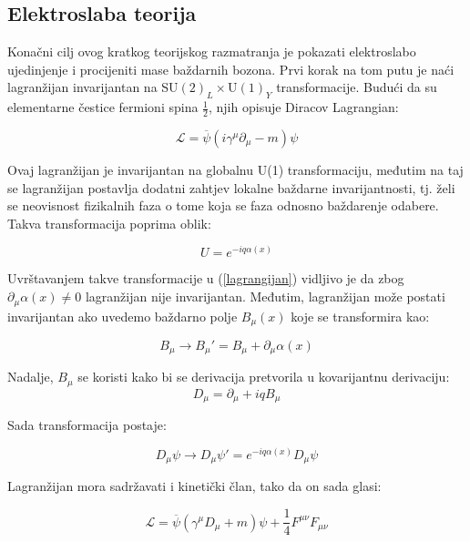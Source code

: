 \documentclass[a4paper,12pt]{report}
\begin{document}
\subsection{Elektroslaba teorija}
Konačni cilj ovog kratkog teorijskog razmatranja je pokazati elektroslabo ujedinjenje i procijeniti mase baždarnih bozona. Prvi korak na tom putu je naći lagranžijan invarijantan na SU$(2)_L\times$U$(1)_Y$ transformacije. Budući da su elementarne čestice fermioni spina $\frac{1}{2}$, njih opisuje Diracov Lagrangian:

\begin{equation}
\mathcal{L}= \overline{\psi}(i\gamma^{\mu}\partial_{\mu}-m)\psi
\label{lagrangijan}
\end{equation} 

Ovaj lagranžijan je invarijantan na globalnu U(1) transformaciju, međutim na taj se lagranžijan postavlja dodatni zahtjev lokalne baždarne invarijantnosti, tj. želi se neovisnost fizikalnih faza o tome koja se faza odnosno baždarenje odabere. Takva transformacija poprima oblik:

\begin{equation}
U=e^{-iq\alpha(x)}
\label{u1}
\end{equation}

Uvrštavanjem takve transformacije u (\ref{lagrangijan}) vidljivo je da zbog $\partial_{\mu} \alpha(x) \neq 0$ lagranžijan nije invarijantan. Međutim, lagranžijan može postati invarijantan ako uvedemo baždarno polje $B_{\mu} (x)$ koje se transformira kao:

\begin{equation}
B_\mu\rightarrow B_{\mu}'=B_{\mu}+\partial_\mu \alpha(x)
\label{be}
\end{equation} 

Nadalje, $B_\mu$ se koristi kako bi se derivacija pretvorila u kovarijantnu derivaciju:
\begin{equation}
D_\mu=\partial_{\mu} +iqB_\mu 
\label{kovdev}
\end{equation}

Sada transformacija postaje:

\begin{equation}
D_\mu \psi\rightarrow D_\mu \psi' = e^{-iq\alpha(x)} D_\mu \psi 
\label{trans}
\end{equation} 

Lagranžijan mora sadržavati i kinetički član, tako da on sada glasi:

\begin{equation}
\mathcal{L}=\overline{\psi}(\gamma^{\mu} D_{\mu}+m)\psi + \frac{1}{4}F^{\mu \nu} F_{\mu \nu}
\label{u1lagr}
\end{equation}
\end{document}
